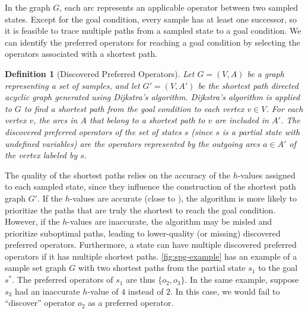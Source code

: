 \documentclass[ppgc,diss,english]{iiufrgs}
\newtheorem{definition}{Definition}
\begin{document}
In the graph $G$, each arc represents an applicable operator between two sampled states. Except for the goal condition, every sample has at least one successor, so it is feasible to trace multiple paths from a sampled state to a goal condition. We can identify the preferred operators for reaching a goal condition by selecting the operators associated with a shortest path.

\begin{definition}[Discovered Preferred Operators]\label{def:discovered_preferred_operators}
Let $G = (V, A)$ be a graph representing a set of samples, and let $G' = (V, A')$ be the shortest path directed acyclic graph generated using Dijkstra's algorithm. Dijkstra's algorithm is applied to $G$ to find a shortest path from the goal condition to each vertex $v \in V$. For each vertex $v$, the arcs in $A$ that belong to a shortest path to $v$ are included in $A'$. The discovered preferred operators of the set of states $s$ (since $s$ is a partial state with undefined variables) are the operators represented by the outgoing arcs $a \in A'$ of the vertex labeled by $s$.
\end{definition}

The quality of the shortest paths relies on the accuracy of the $h$-values assigned to each sampled state, since they influence the construction of the shortest path graph $G'$. If the $h$-values are accurate (close to \hstar), the algorithm is more likely to prioritize the paths that are truly the shortest to reach the goal condition. However, if the $h$-values are inaccurate, the algorithm may be misled and prioritize suboptimal paths, leading to lower-quality (or missing) discovered preferred operators.
Furthermore, a state can have multiple discovered preferred operators if it has multiple shortest paths. \cref{fig:spg-example} has an example of a sample set graph $G$ with two shortest paths from the partial state $s_{1}$ to the goal $s^{*}$. The preferred operators of $s_{1}$ are thus $\{o_{2}, o_{3}\}$. In the same example, suppose $s_{3}$ had an inaccurate $h$-value of $4$ instead of $2$. In this case, we would fail to ``discover'' operator $o_{2}$ as a preferred operator.
\end{document}
